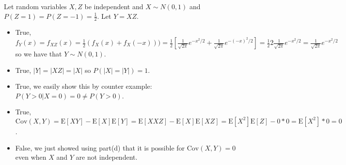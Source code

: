\documentclass[12pt]{article}
\newcommand{\E}{\mathrm{E}}
\newcommand{\Cov}{\mathrm{Cov}}
\newenvironment{problem}[2][Problem]{\begin{trivlist}
\item[\hskip \labelsep {\bfseries #1}\hskip \labelsep {\bfseries #2}]}{\end{trivlist}}
\begin{document}
\begin{problem}{7.} Let random variables $X,Z$ be independent and $X \sim N(0,1)$ and $P(Z=1)=P(Z=-1)=\frac{1}{2}$. Let $Y=XZ$. 
\begin{itemize}
\item[(a)] True, $f_Y(x) = f_{XZ}( x) = \frac{1}{2}(f_X(x) + f_X(-x))) =\frac{1}{2}[ \frac{1}{\sqrt{2\pi}}e^{-x^2/2} + \frac{1}{\sqrt{2\pi}}e^{-(-x)^2/2}] = \frac{1}{2}2 \frac{1}{\sqrt{2\pi}}e^{-x^2/2} = \frac{1}{\sqrt{2\pi}}e^{-x^2/2}$ so we have that $Y \sim N(0,1)$. 
\item[(b)] True, $|Y| = |XZ| = |X|$ so $P(|X| = |Y|) = 1$. 
\item[(c)] True, we easily show this by counter example: $P(Y>0 | X=0) = 0 \neq P(Y>0)$. 
\item[(d)] True, $\Cov(X,Y)  = \E[XY]-\E[X]\E[Y] = \E[XXZ]-\E[X]\E[XZ] =  \E[X^2]\E[Z]-0*0 =  \E[X^2]*0 = 0$. 
\item[(e)] False, we just showed using part(d) that it is possible for  $\Cov(X,Y) =0$ even when $X$ and $Y$ are not independent. 
\end{itemize}
\end{problem}
\end{document}
